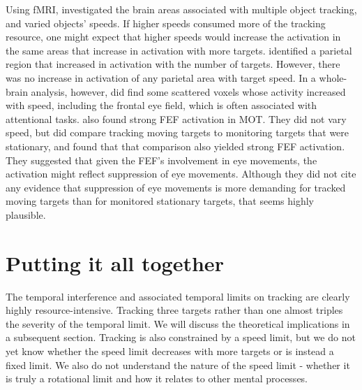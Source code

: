 \documentclass[
]{book}
\begin{document}
Using fMRI, \citet{shimNumberAttentionalFoci2010} investigated the brain areas associated with multiple object tracking, and varied objects' speeds. If higher speeds consumed more of the tracking resource, one might expect that higher speeds would increase the activation in the same areas that increase in activation with more targets. \citet{shimNumberAttentionalFoci2010} identified a parietal region that increased in activation with the number of targets. However, there was no increase in activation of any parietal area with target speed. In a whole-brain analysis, however, \citet{shimNumberAttentionalFoci2010} did find some scattered voxels whose activity increased with speed, including the frontal eye field, which is often associated with attentional tasks. \citet{howeUsingFMRIDistinguish2009} also found strong FEF activation in MOT. They did not vary speed, but did compare tracking moving targets to monitoring targets that were stationary, and found that that comparison also yielded strong FEF activation. They suggested that given the FEF's involvement in eye movements, the activation might reflect suppression of eye movements. Although they did not cite any evidence that suppression of eye movements is more demanding for tracked moving targets than for monitored stationary targets, that seems highly plausible.

\hypertarget{putting-it-all-together}{%
\section{Putting it all together}\label{putting-it-all-together}}

The temporal interference and associated temporal limits on tracking are clearly highly resource-intensive. Tracking three targets rather than one almost triples the severity of the temporal limit. We will discuss the theoretical implications in a subsequent section. Tracking is also constrained by a speed limit, but we do not yet know whether the speed limit decreases with more targets or is instead a fixed limit. We also do not understand the nature of the speed limit - whether it is truly a rotational limit and how it relates to other mental processes.
\end{document}
